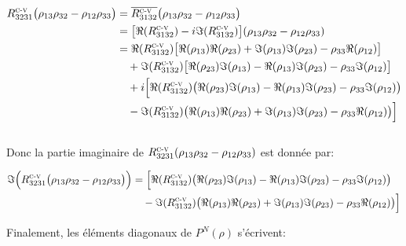 \documentclass[12pt,a4paper,openany,oneside]{book}
\begin{document}
{{{{{{\begin{eqnarray*}
\begin{split}
R^{\textsc{c-v}}_{3231}\big(\rho_{13}\rho_{32}-\rho_{12}\rho_{33}\big) &=\overline{R^{\textsc{c-v}}_{3132}} \big(\rho_{13}\rho_{32}-\rho_{12}\rho_{33}\big)\\
&= \big[\Re(R^{\textsc{c-v}}_{3132})-i\Im(R^{\textsc{c-v}}_{3132})\big](\rho_{13}\rho_{32}-\rho_{12}\rho_{33})\\
&= \Re(R^{\textsc{c-v}}_{3132})\big[\Re(\rho_{13})\Re(\rho_{23})+\Im(\rho_{13})\Im(\rho_{23})-\rho_{33}\Re(\rho_{12})\big]\\
&\quad +\Im(R^{\textsc{c-v}}_{3132})\big[\Re(\rho_{23})\Im(\rho_{13})-\Re(\rho_{13})\Im(\rho_{23})-\rho_{33}\Im(\rho_{12})\big]\\
&\quad +i\Big[\Re(R^{\textsc{c-v}}_{3132})\big(\Re(\rho_{23})\Im(\rho_{13})-\Re(\rho_{13})\Im(\rho_{23})-\rho_{33}\Im(\rho_{12})\big)\\
&\quad -\Im(R^{\textsc{c-v}}_{3132})\big(\Re(\rho_{13})\Re(\rho_{23})+\Im(\rho_{13})\Im(\rho_{23})-\rho_{33}\Re(\rho_{12})\big)\Big]
\end{split}
\end{eqnarray*}\\

Donc la partie imaginaire de $ R^{\textsc{c-v}}_{3231}(\rho_{13}\rho_{32}-\rho_{12}\rho_{33})$ est donnée par:

\begin{eqnarray*}
\begin{split}
\Im\Big(R^{\textsc{c-v}}_{3231}\big(\rho_{13}\rho_{32}-\rho_{12}\rho_{33}\big)\Big) &= \Big[\Re(R^{\textsc{c-v}}_{3132})\big(\Re(\rho_{23})\Im(\rho_{13})-\Re(\rho_{13})\Im(\rho_{23})-\rho_{33}\Im(\rho_{12})\big)\\
&\quad -\Im(R^{\textsc{c-v}}_{3132})\big(\Re(\rho_{13})\Re(\rho_{23})+\Im(\rho_{13})\Im(\rho_{23})-\rho_{33}\Re(\rho_{12})\big)\Big]
\end{split}
\end{eqnarray*}



Finalement, les éléments diagonaux de $  P^{N}(\rho) $ s'écrivent:


}}}}}}
\end{document}
